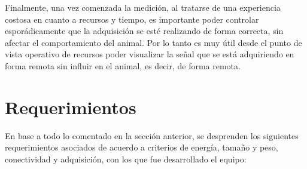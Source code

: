 Finalmente, una vez comenzada la medición, al tratarse de una experiencia costosa en cuanto a recursos y tiempo, es importante poder controlar esporádicamente que la adquisición se esté realizando de forma correcta, sin afectar el comportamiento del animal. Por lo tanto es muy útil desde el punto de vista operativo de recursos poder visualizar la señal que se está adquiriendo en forma remota sin influir en el animal, es decir, de forma remota.


\section{Requerimientos} \label{requerimientos}

En base a todo lo comentado en la sección anterior, se desprenden los siguientes requerimientos asociados de acuerdo a criterios de energía, tamaño y peso, conectividad y adquisición, con los que fue desarrollado el equipo:


